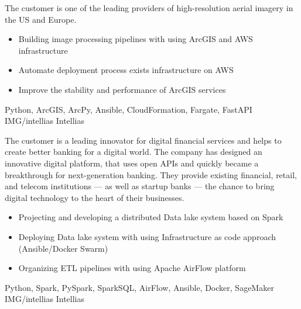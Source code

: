\documentclass[paper=a4,fontsize=11pt]{temp} %
\begin{document}

\noindent


{The customer is one of the leading providers of high-resolution aerial imagery in the US and Europe.}
{
\begin{itemize}
    \setlength\itemsep{0em}
    \item Building image processing pipelines with using ArcGIS and AWS infrastructure
    \item Automate deployment process exists infrastructure on AWS
    \item Improve the stability and performance of ArcGIS services
\end{itemize}
}
{Python, ArcGIS, ArcPy, Ansible, CloudFormation, Fargate, FastAPI}
{IMG/intellias}
{Intellias}

\sepspace

{The customer is a leading innovator for digital financial services and helps to create better banking for a digital world.
The company has designed an innovative digital platform, that uses open APIs and quickly became a breakthrough for
next-generation banking. They provide existing financial, retail, and telecom institutions — as well as startup banks —
the chance to bring digital technology to the heart of their businesses.}
{
\begin{itemize}
    \setlength\itemsep{0em}
    \item Projecting and developing a distributed Data lake system based on Spark
    \item Deploying Data lake system with using Infrastructure as code approach (Ansible/Docker Swarm)
    \item Organizing ETL pipelines with using Apache AirFlow platform
\end{itemize}
}
{Python, Spark, PySpark, SparkSQL, AirFlow, Ansible, Docker, SageMaker}
{IMG/intellias}
{Intellias}

\sepspace
\clearpage
\end{document}
